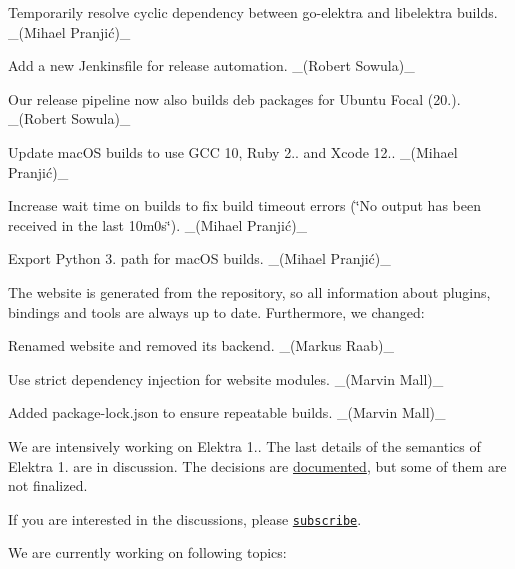 \begin{DoxyItemize}
\item Temporarily resolve cyclic dependency between go-\/elektra and libelektra builds. \+\_\+(Mihael Pranjić)\+\_\+
\item Add a new Jenkinsfile for release automation. \+\_\+(\+Robert Sowula)\+\_\+
\item Our release pipeline now also builds deb packages for Ubuntu Focal (20.). \+\_\+(\+Robert Sowula)\+\_\+
\end{DoxyItemize}


\begin{DoxyItemize}
\item Update mac\+OS builds to use G\+CC 10, Ruby 2.. and Xcode 12.. \+\_\+(Mihael Pranjić)\+\_\+
\item Increase wait time on builds to fix build timeout errors (\char`\"{}\+No output has been received in the last 10m0s\char`\"{}). \+\_\+(Mihael Pranjić)\+\_\+
\item Export Python 3. path for mac\+OS builds. \+\_\+(Mihael Pranjić)\+\_\+
\end{DoxyItemize}

The website is generated from the repository, so all information about plugins, bindings and tools are always up to date. Furthermore, we changed\+:


\begin{DoxyItemize}
\item Renamed website and removed its backend. \+\_\+(\+Markus Raab)\+\_\+
\item Use strict dependency injection for website modules. \+\_\+(\+Marvin Mall)\+\_\+
\item Added {\ttfamily package-\/lock.\+json} to ensure repeatable builds. \+\_\+(\+Marvin Mall)\+\_\+
\end{DoxyItemize}

We are intensively working on Elektra 1.. The last details of the semantics of Elektra 1. are in discussion. The decisions are \hyperlink{doc_decisions_README_md}{documented}, but some of them are not finalized.

If you are interested in the discussions, please \href{https://issues.libelektra.org/3520}{\tt subscribe}.

We are currently working on following topics\+:


